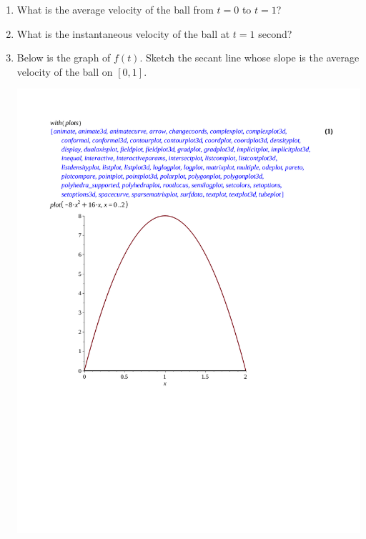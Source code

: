 \documentclass[12pt]{article}
\newif\ifans
\begin{document}
\begin{enumerate}
\begin{enumerate}
\ifans{\fbox{After $2$ seconds}} \fi

\item What is the average velocity of the ball from $t=0$ to $t=1$? 

\ifans{\fbox{8 ft/sec}} \fi

\item What is the instantaneous velocity of the ball at $t=1$ second?

\ifans{\fbox{0 ft/sec}} \fi 

\newpage

\item Below is the graph of $f(t)$.  Sketch the secant line whose slope is the average velocity of the ball on $[0,1]$.\\

\begin{center}
\includegraphics[scale=0.5]{graph2.pdf}
\end{center} 


\end{enumerate}
\end{enumerate}
\end{document}
